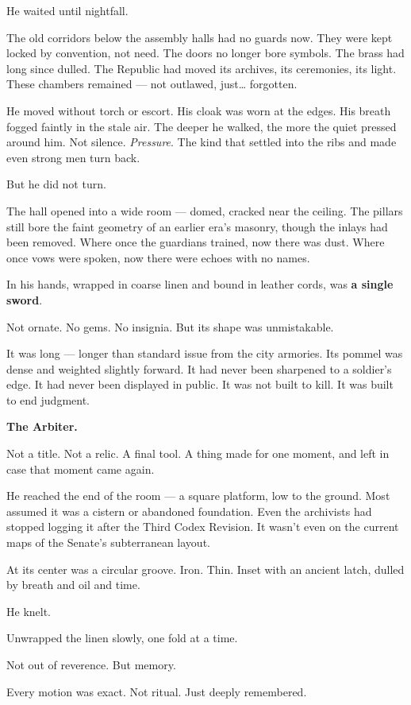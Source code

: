 \documentclass[12pt]{article}
\begin{document}
He waited until nightfall.

The old corridors below the assembly halls had no guards now. They were kept locked by convention, not need. The doors no longer bore symbols. The brass had long since dulled. The Republic had moved its archives, its ceremonies, its light. These chambers remained --- not outlawed, just… forgotten.

He moved without torch or escort. His cloak was worn at the edges. His breath fogged faintly in the stale air. The deeper he walked, the more the quiet pressed around him. Not silence. \textit{Pressure}. The kind that settled into the ribs and made even strong men turn back.

But he did not turn.

The hall opened into a wide room --- domed, cracked near the ceiling. The pillars still bore the faint geometry of an earlier era's masonry, though the inlays had been removed. Where once the guardians trained, now there was dust. Where once vows were spoken, now there were echoes with no names.

In his hands, wrapped in coarse linen and bound in leather cords, was \textbf{a single sword}.

Not ornate. No gems. No insignia. But its shape was unmistakable.

It was long --- longer than standard issue from the city armories. Its pommel was dense and weighted slightly forward. It had never been sharpened to a soldier’s edge. It had never been displayed in public. It was not built to kill. It was built to end judgment.

\textbf{The Arbiter.}

Not a title. Not a relic. A final tool. A thing made for one moment, and left in case that moment came again.

He reached the end of the room --- a square platform, low to the ground. Most assumed it was a cistern or abandoned foundation. Even the archivists had stopped logging it after the Third Codex Revision. It wasn’t even on the current maps of the Senate’s subterranean layout.

At its center was a circular groove. Iron. Thin. Inset with an ancient latch, dulled by breath and oil and time.

He knelt.

Unwrapped the linen slowly, one fold at a time.

Not out of reverence. But memory.

Every motion was exact. Not ritual. Just deeply remembered.
\end{document}

